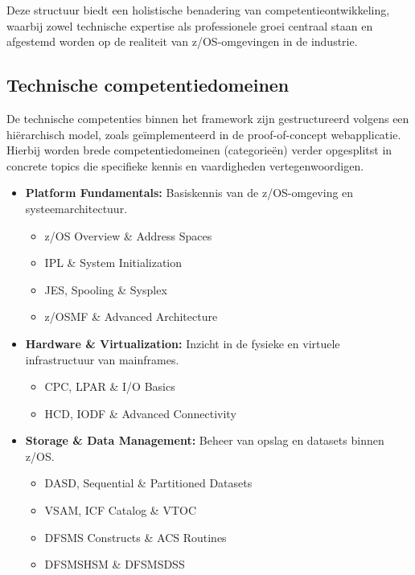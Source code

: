 Deze structuur biedt een holistische benadering van competentieontwikkeling, waarbij zowel technische expertise als professionele groei centraal staan en afgestemd worden op de realiteit van z/OS-omgevingen in de industrie.

\subsection{Technische competentiedomeinen}

De technische competenties binnen het framework zijn gestructureerd volgens een hiërarchisch model, zoals geïmplementeerd in de proof-of-concept webapplicatie. Hierbij worden brede competentiedomeinen (categorieën) verder opgesplitst in concrete topics die specifieke kennis en vaardigheden vertegenwoordigen.

\begin{itemize}
	
	\item \textbf{Platform Fundamentals:} Basiskennis van de z/OS-omgeving en systeemarchitectuur.
	\begin{itemize}
		\item z/OS Overview \& Address Spaces
		\item IPL \& System Initialization
		\item JES, Spooling \& Sysplex
		\item z/OSMF \& Advanced Architecture
	\end{itemize}
	
	\item \textbf{Hardware \& Virtualization:} Inzicht in de fysieke en virtuele infrastructuur van mainframes.
	\begin{itemize}
		\item CPC, LPAR \& I/O Basics
		\item HCD, IODF \& Advanced Connectivity
	\end{itemize}
	
	\item \textbf{Storage \& Data Management:} Beheer van opslag en datasets binnen z/OS.
	\begin{itemize}
		\item DASD, Sequential \& Partitioned Datasets
		\item VSAM, ICF Catalog \& VTOC
		\item DFSMS Constructs \& ACS Routines
		\item DFSMSHSM \& DFSMSDSS
	\end{itemize}
	

\end{itemize}
